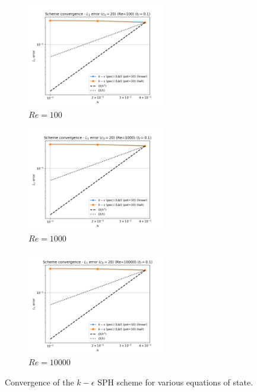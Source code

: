 \begin{figure}[H]
  \begin{subfigure}{7cm}
    \centering\includegraphics[width=6cm]{Code-Figures/keps/eos/dt_pois_conv_c0_20_re_100.png}
    \caption{$Re = 100$}
  \end{subfigure}
  \begin{subfigure}{7cm}
    \centering\includegraphics[width=6cm]{Code-Figures/keps/eos/dt_pois_conv_c0_20_re_1000.png}
    \caption{$Re = 1000$}
  \end{subfigure}
  \begin{subfigure}{7cm}
    \centering\includegraphics[width=6cm]{Code-Figures/keps/eos/dt_pois_conv_c0_20_re_10000.png}
    \caption{$Re = 10000$}
  \end{subfigure}
  \caption{Convergence of the $k-\epsilon$ SPH scheme for various equations of state.}
  \label{fig:keps-eos}
\end{figure}

